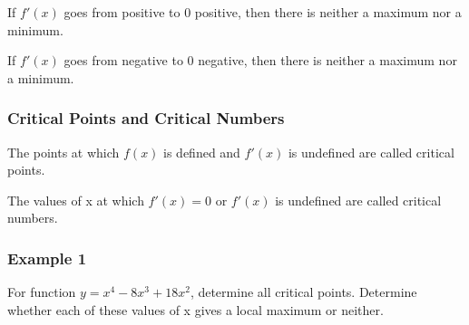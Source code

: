 \documentclass{article}
\begin{document}
If $f'(x)$ goes from positive to 0 positive, then there is neither a maximum nor a minimum.
\begin{center}
\end{center}
If $f'(x)$ goes from negative to 0 negative, then there is neither a maximum nor a minimum.
\begin{center}
\end{center}
\subsubsection{Critical Points and Critical Numbers}
The points at which $f(x)$ is defined and $f'(x)$ is undefined are called critical points.

The values of x at which $f'(x)=0$ or $f'(x)$ is undefined are called critical numbers.

\subsubsection{Example 1}
For function $y=x^4-8x^3+18x^2$, determine all critical points. Determine whether each of these values of x gives a local maximum or neither.
\end{document}
